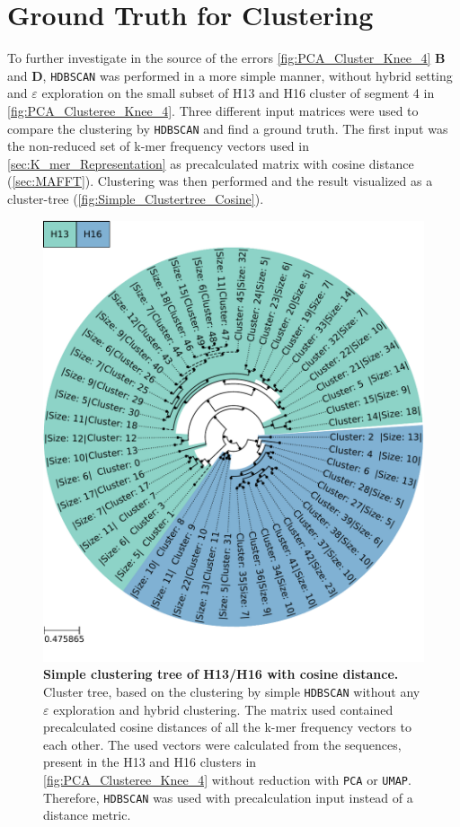 \section{Ground Truth for Clustering} \label{sec:Comparison_Clustering}

To further investigate in the source of the errors \autoref{fig:PCA_Cluster_Knee_4} \textbf{\textsf{B}} and \textbf{\textsf{D}}, \texttt{HDBSCAN} was performed in a more simple manner, without hybrid setting and $\varepsilon$ exploration on the small subset of H13 and H16 cluster of segment 4 in \autoref{fig:PCA_Clusteree_Knee_4}. Three different input matrices were used to compare the clustering by \texttt{HDBSCAN} and find a ground truth. The first input was the non-reduced set of k-mer frequency vectors used in \autoref{sec:K_mer_Representation} as precalculated matrix with cosine distance (\autoref{sec:MAFFT}). Clustering was then performed and the result visualized as a cluster-tree (\autoref{fig:Simple_Clustertree_Cosine}). 

\begin{figure}[!hbt]
    \centering
    \includegraphics[width=\textwidth]{PCA/Clustertree_Segment_4_H_Cosine.pdf}
    \caption[Simple clustering tree of H13/H16 with cosine distance]{\textbf{Simple clustering tree of H13/H16 with cosine distance.} Cluster tree, based on the clustering by simple \texttt{HDBSCAN} without any $\varepsilon$ exploration and hybrid clustering. The matrix used contained precalculated cosine distances of all the k-mer frequency vectors to each other. The used vectors were calculated from the sequences, present in the H13 and H16 clusters in \autoref{fig:PCA_Clusteree_Knee_4} without reduction with \texttt{PCA} or \texttt{UMAP}. Therefore, \texttt{HDBSCAN} was used with precalculation input instead of a distance metric.}
    \label{fig:Simple_Clustertree_Cosine}
\end{figure}

